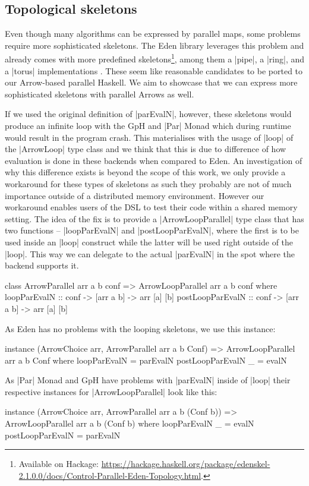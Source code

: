 \subsection{Topological skeletons}
\label{sec:topology-skeletons}
Even though many algorithms can be expressed by parallel maps, some problems require more sophisticated skeletons. The Eden library leverages this problem and already comes with more predefined skeletons\footnote{Available on Hackage: \url{https://hackage.haskell.org/package/edenskel-2.1.0.0/docs/Control-Parallel-Eden-Topology.html}.}, among them a |pipe|, a |ring|, and a |torus| implementations \citep{Eden:SkeletonBookChapter02}. These seem like reasonable candidates to be ported to our Arrow-based parallel Haskell. We aim to showcase that we can express more sophisticated skeletons with parallel Arrows as well.

If we used the original definition of |parEvalN|, however, these skeletons would produce an infinite loop with the GpH and |Par| Monad which during runtime would result in the program crash. This materialises with the usage of |loop| of the |ArrowLoop| type class and we think that this is due to difference of how evaluation is done in these backends when compared to Eden. An investigation of why this difference exists is beyond the scope of this work, we only provide a workaround for these types of skeletons as such they probably are not of much importance outside of a distributed memory environment. However our workaround enables users of the DSL to test their code within a shared memory setting.
The idea of the fix is to provide a |ArrowLoopParallel| type class that has two functions -- |loopParEvalN| and |postLoopParEvalN|, where the first is to be used inside an |loop| construct while the latter will be used right outside of the |loop|. This way we can delegate to the actual |parEvalN| in the spot where the backend supports it.
\begin{code}
class ArrowParallel arr a b conf =>
	ArrowLoopParallel arr a b conf where
    loopParEvalN :: conf -> [arr a b] -> arr [a] [b]
    postLoopParEvalN :: conf -> [arr a b] -> arr [a] [b]
\end{code}
As Eden has no problems with the looping skeletons, we use this instance:
\begin{code}
instance (ArrowChoice arr, ArrowParallel arr a b Conf) =>
	ArrowLoopParallel arr a b Conf where
    loopParEvalN = parEvalN
    postLoopParEvalN _ = evalN
\end{code}
As |Par| Monad and GpH have problems with |parEvalN| inside of |loop| their respective instances for |ArrowLoopParallel| look like this:
\begin{code}
instance (ArrowChoice arr, ArrowParallel arr a b (Conf b)) =>
	ArrowLoopParallel arr a b (Conf b) where
    loopParEvalN _ = evalN
    postLoopParEvalN = parEvalN
\end{code}

